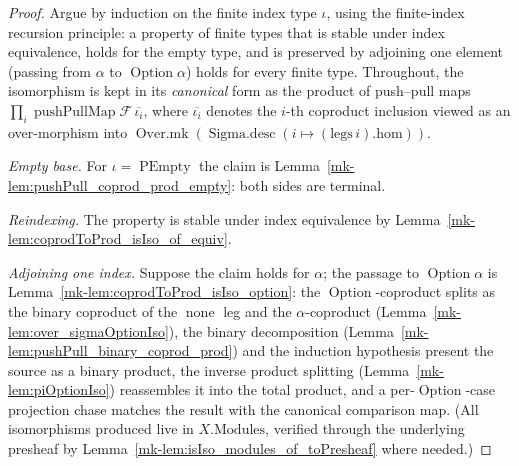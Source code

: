 \begin{proof}
  Argue by induction on the finite index type \(\iota\), using the finite-index recursion principle: a
  property of finite types that is stable under index equivalence, holds for the empty type, and is
  preserved by adjoining one element (passing from \(\alpha\) to \(\operatorname{Option}\alpha\)) holds
  for every finite type. Throughout, the isomorphism is kept in its \emph{canonical} form as
  the product of push--pull maps \(\prod_{i} \operatorname{pushPullMap}\mathcal{F}\,\overline{\iota_i}\),
  where \(\overline{\iota_i}\) denotes the \(i\)-th coproduct inclusion viewed as an over-morphism
  into \(\operatorname{Over.mk}(\operatorname{Sigma.desc}(i \mapsto (\mathrm{legs}\,i).\mathrm{hom}))\).

  \emph{Empty base.} For \(\iota = \operatorname{PEmpty}\) the claim is
  Lemma~\ref{mk-lem:pushPull_coprod_prod_empty}: both sides are terminal.

  \emph{Reindexing.} The property is stable under index equivalence by
  Lemma~\ref{mk-lem:coprodToProd_isIso_of_equiv}.

  \emph{Adjoining one index.} Suppose the claim holds for \(\alpha\); the passage to
  \(\operatorname{Option}\alpha\) is Lemma~\ref{mk-lem:coprodToProd_isIso_option}: the
  \(\operatorname{Option}\)-coproduct splits as the binary coproduct of the \(\operatorname{none}\) leg
  and the \(\alpha\)-coproduct (Lemma~\ref{mk-lem:over_sigmaOptionIso}), the binary decomposition
  (Lemma~\ref{mk-lem:pushPull_binary_coprod_prod}) and the induction hypothesis present the source as a
  binary product, the inverse product splitting (Lemma~\ref{mk-lem:piOptionIso}) reassembles it into the
  total product, and a per-\(\operatorname{Option}\)-case projection chase matches the result with the
  canonical comparison map. (All isomorphisms produced live in \(X.\mathrm{Modules}\), verified through
  the underlying presheaf by Lemma~\ref{mk-lem:isIso_modules_of_toPresheaf} where needed.)
\end{proof}

